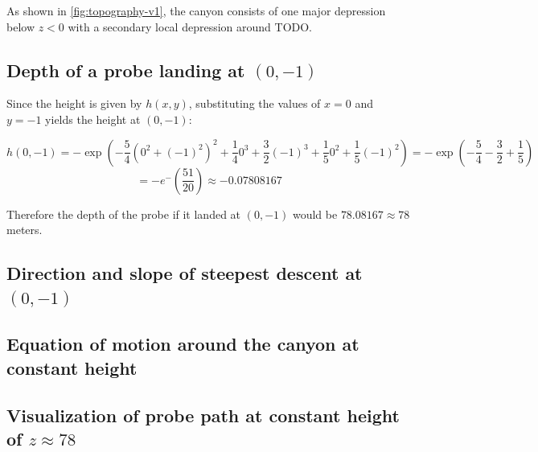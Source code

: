 \documentclass{article}
\begin{document}
As shown in \ref{fig:topography-v1}, the canyon consists of one major depression below $z < 0$ with a secondary local depression around TODO.

\subsection{Depth of a probe landing at $(0, -1)$}

Since the height is given by $h(x,y)$, substituting the values of $x = 0$ and $y = -1$ yields the height at $(0, -1)$:

\[
h \left(0, -1\right)
= - \exp \left(- \frac{5}{4} \left(0^{2}+(-1)^{2}\right)^{2}+\frac{1}{4}0^{3}+\frac{3}{2}(-1)^{3}+\frac{1}{5}0^{2}+\frac{1}{5}(-1)^{2}\right)
= -\exp \left(- \frac{5}{4} -\frac{3}{2} + \frac{1}{5} \right)
\]
\[
= - e ^ -(\frac{51}{20})
\approx -0.07808167
\]

Therefore the depth of the probe if it landed at $(0, -1)$ would be $78.08167 \approx 78$ meters.

\subsection{Direction and slope of steepest descent at $(0, -1)$}

\subsection{Equation of motion around the canyon at constant height}

\subsection{Visualization of probe path at constant height of $z \approx 78$}

% 
% 
\end{document}
